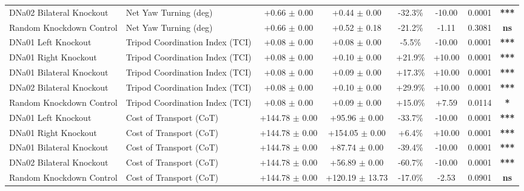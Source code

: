 \begin{table}[htbp]
\begin{tabular}{llcccccc}
DNa02 Bilateral Knockout & Net Yaw Turning (deg) & +0.66 $\pm$ 0.00 & +0.44 $\pm$ 0.00 & -32.3\% & -10.00 & 0.0001 & \textbf{***} \\
Random Knockdown Control & Net Yaw Turning (deg) & +0.66 $\pm$ 0.00 & +0.52 $\pm$ 0.18 & -21.2\% & -1.11 & 0.3081 & \textbf{ns} \\
DNa01 Left Knockout & Tripod Coordination Index (TCI) & +0.08 $\pm$ 0.00 & +0.08 $\pm$ 0.00 & -5.5\% & -10.00 & 0.0001 & \textbf{***} \\
DNa01 Right Knockout & Tripod Coordination Index (TCI) & +0.08 $\pm$ 0.00 & +0.10 $\pm$ 0.00 & +21.9\% & +10.00 & 0.0001 & \textbf{***} \\
DNa01 Bilateral Knockout & Tripod Coordination Index (TCI) & +0.08 $\pm$ 0.00 & +0.09 $\pm$ 0.00 & +17.3\% & +10.00 & 0.0001 & \textbf{***} \\
DNa02 Bilateral Knockout & Tripod Coordination Index (TCI) & +0.08 $\pm$ 0.00 & +0.10 $\pm$ 0.00 & +29.9\% & +10.00 & 0.0001 & \textbf{***} \\
Random Knockdown Control & Tripod Coordination Index (TCI) & +0.08 $\pm$ 0.00 & +0.09 $\pm$ 0.00 & +15.0\% & +7.59 & 0.0114 & \textbf{*} \\
DNa01 Left Knockout & Cost of Transport (CoT) & +144.78 $\pm$ 0.00 & +95.96 $\pm$ 0.00 & -33.7\% & -10.00 & 0.0001 & \textbf{***} \\
DNa01 Right Knockout & Cost of Transport (CoT) & +144.78 $\pm$ 0.00 & +154.05 $\pm$ 0.00 & +6.4\% & +10.00 & 0.0001 & \textbf{***} \\
DNa01 Bilateral Knockout & Cost of Transport (CoT) & +144.78 $\pm$ 0.00 & +87.74 $\pm$ 0.00 & -39.4\% & -10.00 & 0.0001 & \textbf{***} \\
DNa02 Bilateral Knockout & Cost of Transport (CoT) & +144.78 $\pm$ 0.00 & +56.89 $\pm$ 0.00 & -60.7\% & -10.00 & 0.0001 & \textbf{***} \\
Random Knockdown Control & Cost of Transport (CoT) & +144.78 $\pm$ 0.00 & +120.19 $\pm$ 13.73 & -17.0\% & -2.53 & 0.0901 & \textbf{ns} \\
\bottomrule
\end{tabular}
\end{table}
